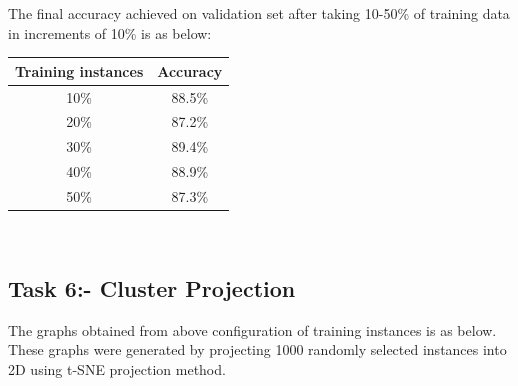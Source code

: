 \documentclass{article}
\begin{document}
The final accuracy achieved on validation set after taking 10-50\% of training data in increments of 10\% is as below:
\begin{table}[!htb]
\centering
\begin{tabular}{|c|c|}
	\hline
	Training instances & Accuracy\\
	\hline
	10\% & 88.5\%\\
	20\% & 87.2\%\\
	30\% & 89.4\%\\
	40\% & 88.9\%\\
	50\% & 87.3\%\\
	\hline
\end{tabular}
\end{table}\\

\pagebreak
\subsection{Task 6:- Cluster Projection}
The graphs obtained from above configuration of training instances is as below. These graphs were generated by projecting 1000 randomly selected instances into 2D using t-SNE projection method.
\end{document}
